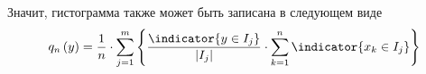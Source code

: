 Значит, гистограмма также может быть записана в следующем виде
$$q_n\left( y \right)
  = \frac{1}{n} \cdot \sum_{j=1}^{m} \left\{
    \frac{\indicator{y \in I_j}}{\left| I_j \right|}
    \cdot \sum_{k=1}^{n} \indicator{x_k\in I_j} \right\}$$
\begin{comment}
Упростим формулу \eqref{eq:histogramPreFinal}, введя функцию
$\nu_j\left(X\right)$ \cite[стр.~68]{BorovkovMS},
которая считает количество элементов выборки $X=x_1, \dots, x_n$,
попавших в интервал $I_j$.
Это будет сумма индикаторов того, что элемент $x_k$ попал в $I_j$

$$\nu_j\left(X\right)
= \sum_{x\in X} \indicator{x\in I_j}
= \sum_{k=1}^n \indicator{x_k\in I_j}$$

Поскольку $\indicator{y\in I_j}$ зависит от $j$ и не зависит от $k$,
то его можно перенести во внешнюю сумму. Получаем следующую формулу
$$q_n\left(y\right)
= \sum_{j=1}^m \frac{\nu_j\left(X\right)}{n\cdot\left|I_j\right|}
  \cdot \indicator{y\in I_j}$$

У этой суммы только один ненулевой элемент,
так как $y$ может попасть только в один полуинтервал.
Тогда обозначим номер отрезка, в который попал $y$, через $k$ ($y\in I_k$),
а функцию $q_n\left(y\right)$ запишем как $q_n^k$
\begin{equation}\label{eq:histogram_borovkov}
  q_n^k = \frac{\nu_k\left(X\right)}{n\cdot\left|I_k\right|}
\end{equation}


Что мы тут видим?

Теперь $k$ --- номер столбика гистограммы. В математическом смысле это
номер интересующего нас полуинтервала --- того, в который попал $y$.

Высота столбика --- значение функции на определённом полуинтервале ---
пропорциональна количеству элементов, попавших в этот отрезок, что логично.

Делителю $\left|I_k\right|$ отведена особая роль --- он предотвращает
искажение гистограммы, когда длины отрезков разные; когда они одинаковые,
можно вынести длину как нормирующий множитель. То есть, чем длиннее отрезок,
тем ниже столбик, так как элементы более размазаны по отрезку, что тоже логично.

Представим, что значение функции --- это высота прямоугольника,
а длина отрезка --- его ширина (графически это изображается именно так).
Тогда отношение количества элементов, попавших в полуинтервал,
к количеству всех элементов выборки (вероятность того, что случайно взятый
элемент из выборки попадёт в $k$-ый отрезок \cite[стр.~24]{BorovkovMS}),
является площадью прямоугольника. Воспользовавшись формулой
\eqref{eq:histogram_borovkov}, получаем равенство
$$S_k
  = q_n^k \cdot \left| I_k \right|
  = \frac{\nu_k\left(X\right)}{n}= \probabilityn{x\in I_k}$$


\end{comment}
